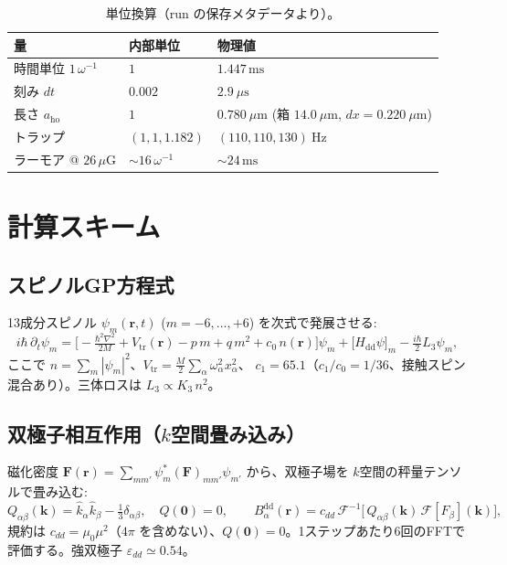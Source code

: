 \documentclass[11pt]{ltjsarticle}
\newcommand{\uG}{\,\mu\mathrm{G}}
\newcommand{\ms}{\,\mathrm{ms}}
\newcommand{\wref}{\omega^{-1}}
\begin{document}
\begin{table}[h]\centering
\begin{tabular}{lll}
\toprule
量 & 内部単位 & 物理値\\\midrule
時間単位 $1\,\wref$ & $1$ & $1.447\ms$\\
刻み $dt$ & $0.002$ & $2.9\ \mu\mathrm{s}$\\
長さ $a_{\mathrm{ho}}$ & $1$ & $0.780\ \mu\mathrm{m}$ (箱 $14.0\ \mu\mathrm{m}$, $dx=0.220\ \mu\mathrm{m}$)\\
トラップ & $(1,1,1.182)$ & $(110,110,130)\ \mathrm{Hz}$\\
ラーモア @ $26\uG$ & $\sim16\,\wref$ & $\sim24\ms$\\
\bottomrule
\end{tabular}
\caption{単位換算（run の保存メタデータより）。}
\label{tab:units}
\end{table}

\section{計算スキーム}
\subsection{スピノルGP方程式}
13成分スピノル $\psi_m(\mathbf r,t)$ ($m={-}6,\dots,{+}6$) を次式で発展させる:
\begin{equation}
i\hbar\,\partial_t\psi_m=\Big[-\tfrac{\hbar^2\nabla^2}{2M}+V_{\mathrm{tr}}(\mathbf r)
-p\,m+q\,m^2+c_0\,n(\mathbf r)\Big]\psi_m
+\big[H_{\mathrm{dd}}\psi\big]_m-\tfrac{i\hbar}{2}L_3\psi_m,
\end{equation}
ここで $n=\sum_m|\psi_m|^2$、$V_{\mathrm{tr}}=\tfrac{M}{2}\sum_\alpha\omega_\alpha^2 x_\alpha^2$、
$c_1=65.1$（$c_1/c_0=1/36$、接触スピン混合あり）。三体ロスは $L_3\propto K_3\,n^2$。

\subsection{双極子相互作用（$k$空間畳み込み）}
磁化密度 $\mathbf F(\mathbf r)=\sum_{mm'}\psi_m^{*}(\mathbf F)_{mm'}\psi_{m'}$ から、双極子場を
$k$空間の秤量テンソルで畳み込む:
\begin{equation}
Q_{\alpha\beta}(\mathbf k)=\hat k_\alpha \hat k_\beta-\tfrac13\delta_{\alpha\beta},
\quad Q(\mathbf 0)=0,\qquad
B^{\mathrm{dd}}_\alpha(\mathbf r)=c_{dd}\,\mathcal F^{-1}\!\big[\,Q_{\alpha\beta}(\mathbf k)\,
\mathcal F[F_\beta](\mathbf k)\big],
\end{equation}
規約は $c_{dd}=\mu_0\mu^2$（$4\pi$ を含めない）、$Q(\mathbf 0)=0$。1ステップあたり6回のFFTで
評価する。強双極子 $\varepsilon_{dd}\simeq0.54$。
\end{document}
